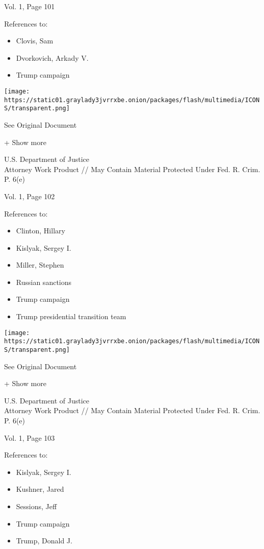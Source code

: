 Vol. 1, Page 101

References to:

\begin{itemize}
\tightlist
\item
  Clovis, Sam
\item
  Dvorkovich, Arkady V.
\item
  Trump campaign
\end{itemize}

\protect\hyperlink{}{}

\texttt{[image: https://static01.graylady3jvrrxbe.onion/packages/flash/multimedia/ICONS/transparent.png]}

See Original Document

+ Show more

U.S. Department of Justice\\
Attorney Work Product // May Contain Material Protected Under Fed. R.
Crim. P. 6(e)

Vol. 1, Page 102

References to:

\begin{itemize}
\tightlist
\item
  Clinton, Hillary
\item
  Kislyak, Sergey I.
\item
  Miller, Stephen
\item
  Russian sanctions
\item
  Trump campaign
\item
  Trump presidential transition team
\end{itemize}

\protect\hyperlink{}{}

\texttt{[image: https://static01.graylady3jvrrxbe.onion/packages/flash/multimedia/ICONS/transparent.png]}

See Original Document

+ Show more

U.S. Department of Justice\\
Attorney Work Product // May Contain Material Protected Under Fed. R.
Crim. P. 6(e)

Vol. 1, Page 103

References to:

\begin{itemize}
\tightlist
\item
  Kislyak, Sergey I.
\item
  Kushner, Jared
\item
  Sessions, Jeff
\item
  Trump campaign
\item
  Trump, Donald J.
\end{itemize}

